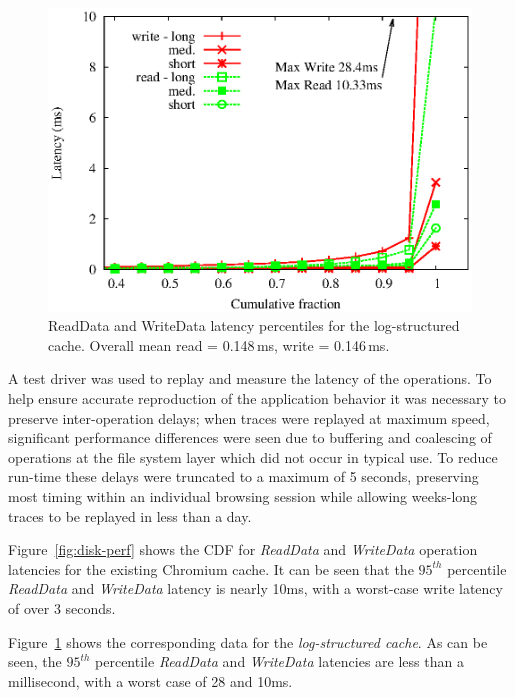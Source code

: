 \documentclass[letterpaper,twocolumn,10pt]{article}
\begin{document}
\begin{figure}
  \begin{center}
    \includegraphics[width=1.04\columnwidth]{graphs/flash-perf}
  \end{center}
  \caption{ReadData and WriteData latency percentiles for the log-structured
    cache. Overall mean read = 0.148\,ms, write = 0.146\,ms.}
  \label{fig:flash-perf} 
\vspace{-0.2in}
\end{figure}

A test driver was used to replay and measure the latency of the operations. To
help ensure accurate reproduction of the application behavior it was
necessary to preserve inter-operation delays; when traces were
replayed at maximum speed, significant performance differences were
seen due to buffering and coalescing of operations at the file system
layer which did not occur in typical use. To reduce run-time these
delays were truncated to a maximum of 5 seconds, preserving most timing
within an individual browsing session while allowing weeks-long traces
to be replayed in less than a day.

Figure~\ref{fig:disk-perf} shows the CDF for \emph{ReadData} and
\emph{WriteData} operation latencies for the existing Chromium cache.  It can be
seen that the $95^{th}$ percentile \emph{ReadData} and \emph{WriteData} latency
is nearly 10ms, with a worst-case write latency of over 3 seconds.

Figure~\ref{fig:flash-perf} shows the corresponding data for the
\emph{log-structured cache}.  As can be seen, the $95^{th}$ percentile
\emph{ReadData} and \emph{WriteData} latencies are less than a millisecond, with
a worst case of 28 and 10ms.
\end{document}
